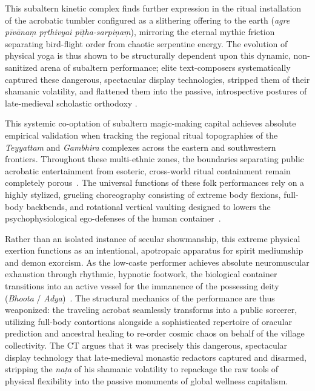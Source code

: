 \documentclass[11pt,twoside,letterpaper]{article}
\begin{document}
This subaltern kinetic complex finds further expression in the ritual installation of the acrobatic tumbler configured as a slithering offering to the earth (\textit{agre pīvānaṃ pṛthivyai pīṭha-sarpiṇaṃ}), mirroring the eternal mythic friction separating bird-flight order from chaotic serpentine energy. The evolution of physical yoga is thus shown to be structurally dependent upon this dynamic, non-sanitized arena of subaltern performance; elite text-composers systematically captured these dangerous, spectacular display technologies, stripped them of their shamanic volatility, and flattened them into the passive, introspective postures of late-medieval scholastic orthodoxy \citep{Birch2024, Mallinson2017, Wujastyk2025}.

This systemic co-optation of subaltern magic-making capital achieves absolute empirical validation when tracking the regional ritual topographies of the \textit{Teyyattam} and \textit{Gambhira} complexes across the eastern and southwestern frontiers. Throughout these multi-ethnic zones, the boundaries separating public acrobatic entertainment from esoteric, cross-world ritual containment remain completely porous~\cite{teyyam1971}. The universal functions of these folk performances rely on a highly stylized, grueling choreography consisting of extreme body flexions, full-body backbends, and rotational vertical vaulting designed to lowers the psychophysiological ego-defenses of the human container~\cite{folklore1972}. 

Rather than an isolated instance of secular showmanship, this extreme physical exertion functions as an intentional, apotropaic apparatus for spirit mediumship and demon exorcism. As the low-caste performer achieves absolute neuromuscular exhaustion through rhythmic, hypnotic footwork, the biological container transitions into an active vessel for the immanence of the possessing deity (\textit{Bhoota} / \textit{Adya})~\cite{teyyam1971, folklore1972}. The structural mechanics of the performance are thus weaponized: the traveling acrobat seamlessly transforms into a public sorcerer, utilizing full-body contortions alongside a sophisticated repertoire of oracular prediction and ancestral healing to re-order cosmic chaos on behalf of the village collectivity. The CT argues that it was precisely this dangerous, spectacular display technology that late-medieval monastic redactors captured and disarmed, stripping the \textit{naṭa} of his shamanic volatility to repackage the raw tools of physical flexibility into the passive monuments of global wellness capitalism.
\end{document}
